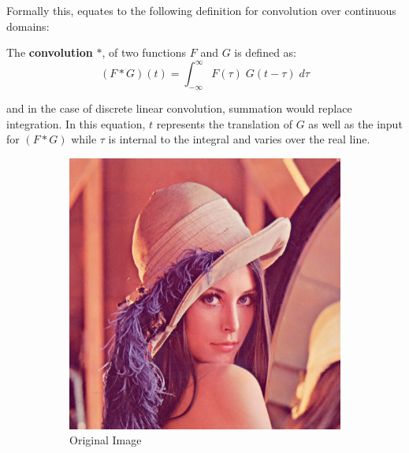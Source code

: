 Formally this, equates to the following definition for convolution over continuous domains:
\begin{definition}
	The \textbf{convolution} $*$, of two functions $F$ and $G$ is defined as:
	\begin{equation}
		(F*G)(t) = \int_{-\infty}^\infty F(\tau) \;G(t - \tau) \; d\tau
	\end{equation}
\end{definition}
and in the case of discrete linear convolution, summation would replace integration.
In this equation, $t$ represents the translation of $G$ as well as the input for $(F*G)$
while $\tau$ is internal to the integral and varies over the real line.


\begin{figure}[ht]
	\caption[Gaussian Blurring]{512x512px ``Lena''(a) with a 1px (b) and 5px (c) Gaussian blur applied. 
	Gaussian blurring is accomplished by convolving an image with a Gaussian kernel and is commonly used
	in image processing to reduce noise prior to edge detection.
	\label{fig:LenaBlur}}
	\centering
	\begin{subfigure}[b]{0.3\textwidth}
                \includegraphics[scale=0.25]{diagrams/Lenna}
                \caption{Original Image}
       \end{subfigure}
       \begin{subfigure}[b]{0.3\textwidth}

\end{subfigure}
\end{figure}
